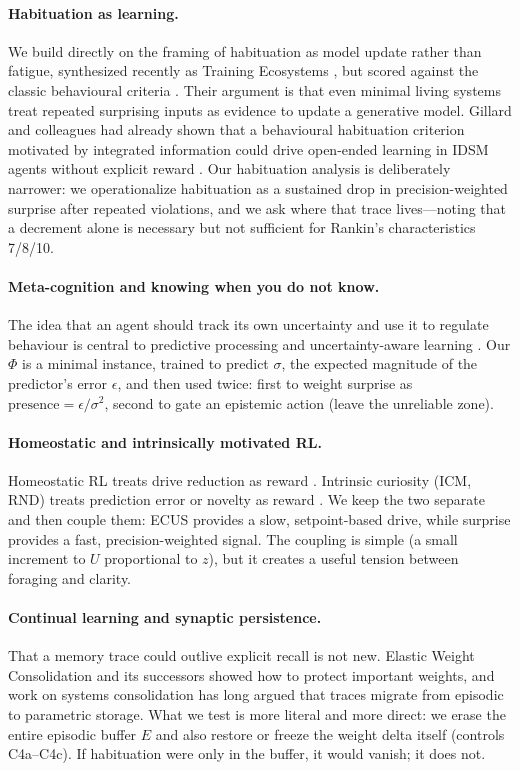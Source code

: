 \documentclass[11pt,a4paper]{article}
\begin{document}
\paragraph{Habituation as learning.} We build directly on the framing of habituation as model update rather than fatigue, synthesized recently as Training Ecosystems \cite{levin2026}, but scored against the classic behavioural criteria \cite{thompson1966,rankin2009}. Their argument is that even minimal living systems treat repeated surprising inputs as evidence to update a generative model. Gillard and colleagues had already shown that a behavioural habituation criterion motivated by integrated information could drive open-ended learning in IDSM agents without explicit reward \cite{gillard2022}. Our habituation analysis is deliberately narrower: we operationalize habituation as a sustained drop in precision-weighted surprise after repeated violations, and we ask where that trace lives---noting that a decrement alone is necessary but not sufficient for Rankin's characteristics 7/8/10.

\paragraph{Meta-cognition and knowing when you do not know.} The idea that an agent should track its own uncertainty and use it to regulate behaviour is central to predictive processing and uncertainty-aware learning \cite{friston2010, laukkonen2025}. Our $\Phi$ is a minimal instance, trained to predict $\sigma$, the expected magnitude of the predictor's error $\epsilon$, and then used twice: first to weight surprise as $\mathrm{presence} = \epsilon / \sigma^2$, second to gate an epistemic action (leave the unreliable zone).

\paragraph{Homeostatic and intrinsically motivated RL.} Homeostatic RL treats drive reduction as reward \cite{kernelan2014, man2016}. Intrinsic curiosity (ICM, RND) treats prediction error or novelty as reward \cite{pathak2017, burda2018}. We keep the two separate and then couple them: ECUS provides a slow, setpoint-based drive, while surprise provides a fast, precision-weighted signal. The coupling is simple (a small increment to $U$ proportional to $z$), but it creates a useful tension between foraging and clarity.

\paragraph{Continual learning and synaptic persistence.} That a memory trace could outlive explicit recall is not new. Elastic Weight Consolidation \cite{kirkpatrick2017} and its successors showed how to protect important weights, and work on systems consolidation has long argued that traces migrate from episodic to parametric storage. What we test is more literal and more direct: we erase the entire episodic buffer $E$ and also restore or freeze the weight delta itself (controls C4a--C4c). If habituation were only in the buffer, it would vanish; it does not.
\end{document}
